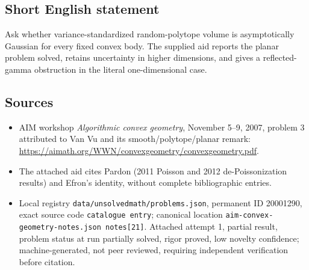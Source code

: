 \documentclass[11pt]{article}
\begin{document}
\subsection{Short English statement}
Ask whether variance-standardized random-polytope volume is asymptotically Gaussian for every fixed convex body. The supplied aid reports the planar problem solved, retains uncertainty in higher dimensions, and gives a reflected-gamma obstruction in the literal one-dimensional case.
\subsection{Sources}
\begin{itemize}
\item AIM workshop \emph{Algorithmic convex geometry}, November 5--9, 2007, problem 3 attributed to Van Vu and its smooth/polytope/planar remark: \url{https://aimath.org/WWN/convexgeometry/convexgeometry.pdf}.
\item The attached aid cites Pardon (2011 Poisson and 2012 de-Poissonization results) and Efron's identity, without complete bibliographic entries.
\item Local registry \texttt{data/unsolvedmath/problems.json}, permanent ID 20001290, exact source code \texttt{catalogue entry}; canonical location \texttt{aim-convex-geometry-notes.json notes[21]}. Attached attempt 1, partial result, problem status at run partially solved, rigor proved, low novelty confidence; machine-generated, not peer reviewed, requiring independent verification before citation.
\end{itemize}
\end{document}
